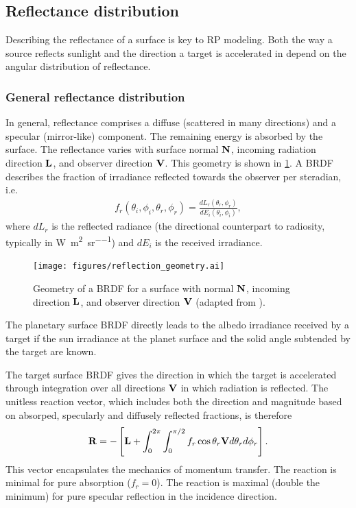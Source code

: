 \subsection{Reflectance distribution}
\label{subsec:general-reflectance-distribution}

Describing the reflectance of a surface is key to \gls{RP} modeling. Both the way a source reflects sunlight and the direction a target is accelerated in depend on the angular distribution of reflectance.

\subsubsection{General reflectance distribution}
In general, reflectance comprises a diffuse (scattered in many directions) and a specular (mirror-like) component. The remaining energy is absorbed by the surface. The reflectance varies with surface normal $\vb N$, incoming radiation direction $\vb L$, and observer direction $\vb V$. This geometry is shown in \cref{fig:reflection-geometry}. A \gls{BRDF} describes the fraction of irradiance reflected towards the observer per steradian, i.e.~\cite{Wetterer2014}
\begin{align}
    f_r (\theta_i, \phi_i, \theta_r, \phi_r)
    = \frac{dL_r(\theta_r, \phi_r)}
    {dE_i(\theta_i, \phi_i)},
\end{align}
where $dL_r$ is the reflected radiance (the directional counterpart to radiosity, typically in \unit{\W\per\square\m\per\steradian}) and $dE_i$ is the received irradiance.

\begin{figure}[t]
    \centering
    \texttt{[image: figures/reflection\_geometry.ai]}
    \caption{Geometry of a \gls{BRDF} for a surface with normal $\vb N$, incoming direction $\vb L$, and observer direction $\vb V$ (adapted from \cite{Wetterer2014}).}
    \label{fig:reflection-geometry}
\end{figure}

The planetary surface \gls{BRDF} directly leads to the albedo irradiance received by a target if the sun irradiance at the planet surface and the solid angle subtended by the target are known.

The target surface \gls{BRDF} gives the direction in which the target is accelerated through integration over all directions $\vb V$ in which radiation is reflected. The unitless reaction vector, which includes both the direction and magnitude based on absorped, specularly and diffusely reflected fractions, is therefore~\cite{Wetterer2014}
\begin{align}
    \label{eq:brdf-reaction-general}
    \vb R = -\left[ \vb L + \int_{0}^{2\pi} \int_{0}^{\pi/2} f_r \cos\theta_r \vb V d\theta_r d\phi_r \right].
\end{align}
This vector encapsulates the mechanics of momentum transfer. The reaction is minimal for pure absorption ($f_r = 0$). The reaction is maximal (double the minimum) for pure specular reflection in the incidence direction.


